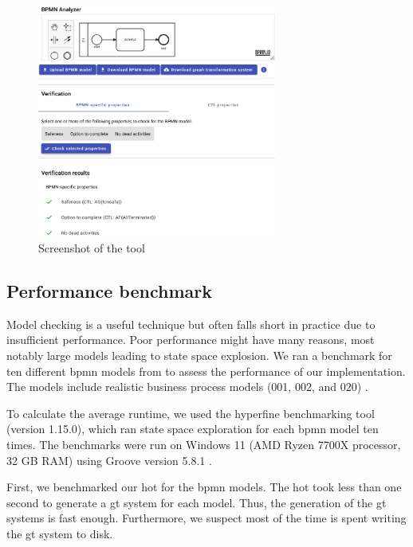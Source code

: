 \documentclass[runningheads]{llncs}
\begin{document}
\begin{figure}[ht]
    \centering
    \includegraphics[width=0.7\textwidth]{images/impl_short.png}
    \caption{Screenshot of the tool}
    \label{fig:implScreenshot}
\end{figure}

\subsection{Performance benchmark}

Model checking is a useful technique but often falls short in practice due to insufficient performance.
Poor performance might have many reasons, most notably large models leading to state space explosion.
We ran a benchmark for ten different \gls*{bpmn} models from \cite{houhouFirstOrderLogicVerification2022} to assess the performance of our implementation.
The models include realistic business process models (001, 002, and 020) \cite{houhouFirstOrderLogicVerification2022}.

To calculate the average runtime, we used the hyperfine benchmarking tool \cite{peterHyperfine2022} (version 1.15.0), which ran state space exploration for each \gls*{bpmn} model ten times.
The benchmarks were run on Windows 11 (AMD Ryzen 7700X processor, 32 GB RAM) using Groove version 5.8.1 \cite{krauterArtifactsICGT2023}. 

First, we benchmarked our \gls*{hot} for the \gls*{bpmn} models.
The \gls*{hot} took less than one second to generate a \gls*{gt} system for each model.
Thus, the generation of the \gls*{gt} systems is fast enough.
Furthermore, we suspect most of the time is spent writing the \gls*{gt} system to disk.
\end{document}
